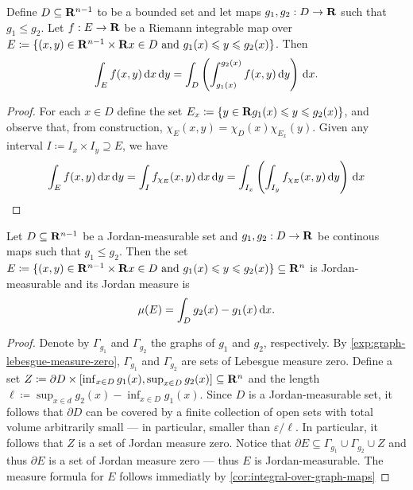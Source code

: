 \begin{corollary}
\label{cor:integral-over-graph-maps}
Define \(D \subseteq \mathbf{R}^{n-1}\) to be a bounded set and let maps \(g_{1}, g_{2}:
D \to \mathbf{R}\) such that \(g_1 \leq g_2\). Let \(f: E \to \mathbf{R}\) be a Riemann
integrable map over \(E \coloneq \{(x, y) \in \mathbf{R}^{n - 1} \times \mathbf{R} \relax x \in D
\text{ and } g_1(x) \leqslant y \leqslant g_2(x)\}\). Then
\[
  \int_E f(x, y)\, \mathrm{d} x\, \mathrm{d} y
  = \int_D \left( \int_{g_1(x)}^{g_2(x)} f(x, y)\, \mathrm{d} y \right)\, \mathrm{d} x.
\]
\end{corollary}

\begin{proof}
For each \(x \in D\) define the set \(E_x \coloneq \{y \in \mathbf{R} \relax g_{1}(x) \leqslant y
\leqslant g_2(x)\}\), and observe that, from construction, \(\chi_E(x, y) = \chi_D(x)
\chi_{E_x}(y)\). Given any interval \(I \coloneq I_x \times I_y \supseteq E\),
we have
\begin{align*}
  \int_E f(x, y)\, \mathrm{d} x\, \mathrm{d} y
  = \int_I f_{\chi_E}(x, y)\, \mathrm{d} x\, \mathrm{d} y
  = \int_{I_x} \left( \int_{I_y} f_{\chi_E}(x, y)\, \mathrm{d} y  \right)\, \mathrm{d} x
\end{align*}
\end{proof}

\begin{corollary}
\label{cor:measure-set-between-graphs-of-continuous-maps}
Let \(D \subseteq \mathbf{R}^{n-1}\) be a Jordan-measurable set and \(g_1, g_2: D \to
\mathbf{R}\) be continous maps such that \(g_1 \leq g_2\). Then the set \(E \coloneq
\{(x, y) \in \mathbf{R}^{n-1} \times \mathbf{R} \relax x \in D \text{ and } g_1(x) \leqslant y \leqslant
g_2(x)\} \subseteq \mathbf{R}^n\) is Jordan-measurable and its Jordan measure is
\[
  \mu(E) = \int_D g_2(x) - g_1(x)\, \mathrm{d} x.
\]
\end{corollary}

\begin{proof}
Denote by \(\Gamma_{g_1}\) and \(\Gamma_{g_2}\) the graphs of \(g_1\) and
\(g_2\), respectively. By \cref{exp:graph-lebesgue-measure-zero},
\(\Gamma_{g_1}\) and \(\Gamma_{g_2}\) are sets of Lebesgue measure
zero. Define a set \(Z \coloneq \partial D \times [\inf_{x \in D} g_1(x),
\sup_{x \in D} g_2(x)] \subseteq \mathbf{R}^n\) and the length \(\ell \coloneq \sup_{x
\in d} g_2(x) - \inf_{x \in D} g_1(x)\). Since \(D\) is a Jordan-measurable set,
it follows that \(\partial D\) can be covered by a finite collection of open
sets with total volume arbitrarily small --- in particular, smaller than
\(\varepsilon / \ell\). In particular, it follows that \(Z\) is a set of Jordan
measure zero. Notice that \(\partial E \subseteq \Gamma_{g_1} \cup
\Gamma_{g_2} \cup Z\) and thus \(\partial E\) is a set of Jordan measure zero
--- thus \(E\) is Jordan-measurable. The measure formula for \(E\) follows
immediatly by \cref{cor:integral-over-graph-maps}
\end{proof}

